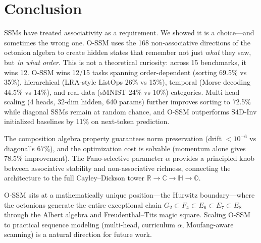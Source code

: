 \documentclass{article}
\newcommand{\Oct}{\mathbb{O}}
\newcommand{\R}{\mathbb{R}}
\newcommand{\C}{\mathbb{C}}
\newcommand{\HH}{\mathbb{H}}
\begin{document}
\section{Conclusion}

SSMs have treated associativity as a requirement.
We showed it is a choice---and sometimes the wrong one.
O-SSM uses the 168 non-associative directions of the octonion algebra to create hidden states that remember not just \emph{what} they saw, but \emph{in what order}.
This is not a theoretical curiosity: across 15 benchmarks, it wins 12.
O-SSM wins 12/15 tasks spanning order-dependent (sorting 69.5\% vs 35\%), hierarchical (LRA-style ListOps 26\% vs 15\%), temporal (Morse decoding 44.5\% vs 14\%), and real-data (sMNIST 24\% vs 10\%) categories.
Multi-head scaling (4 heads, 32-dim hidden, 640 params) further improves sorting to 72.5\% while diagonal SSMs remain at random chance, and O-SSM outperforms S4D-Inv initialized baselines by 11\% on next-token prediction.

The composition algebra property guarantees norm preservation (drift $< 10^{-6}$ vs diagonal's $67\%$), and the optimization cost is solvable (momentum alone gives $78.5\%$ improvement).
The Fano-selective parameter $\alpha$ provides a principled knob between associative stability and non-associative richness, connecting the architecture to the full Cayley--Dickson tower $\R \to \C \to \HH \to \Oct$.

O-SSM sits at a mathematically unique position---the Hurwitz boundary---where the octonions generate the entire exceptional chain $G_2 \subset F_4 \subset E_6 \subset E_7 \subset E_8$ through the Albert algebra and Freudenthal--Tits magic square.
Scaling O-SSM to practical sequence modeling (multi-head, curriculum $\alpha$, Moufang-aware scanning) is a natural direction for future work.


\end{document}

